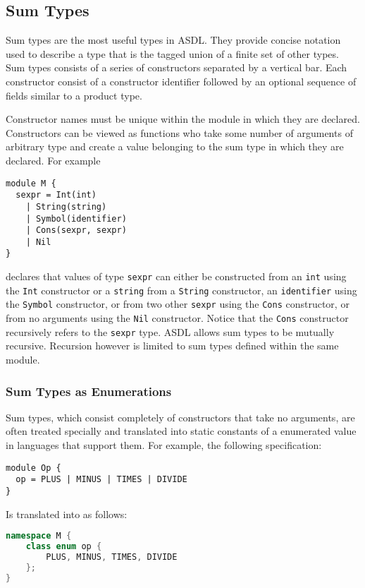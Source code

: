 \subsection{Sum Types}

Sum types are the most useful types in ASDL. They provide concise notation
used to describe a type that is the tagged union of a finite set of other
types.  Sum types consists of a series of constructors separated by a
vertical bar. Each constructor consist of a constructor identifier followed
by an optional sequence of fields similar to a product type. 

Constructor names must be unique within the module in which they are
declared. Constructors can be viewed as functions who take some number of
arguments of arbitrary type and create a value belonging to the sum type in
which they are declared. For example
\begin{code}\begin{lstlisting}[language=ASDL]
module M {
  sexpr = Int(int)
	| String(string)
	| Symbol(identifier)
	| Cons(sexpr, sexpr)
	| Nil
}
\end{lstlisting}\end{code}%
declares that values of type \lstinline[language=ASDL]!sexpr! can either be constructed from an
\lstinline[language=ASDL]!int! using the \lstinline[language=ASDL]!Int! constructor or a \lstinline[language=ASDL]!string! from a \lstinline[language=ASDL]!String!
constructor, an \lstinline[language=ASDL]!identifier! using the \lstinline[language=ASDL]!Symbol! constructor, or from
two other \lstinline[language=ASDL]!sexpr! using the \lstinline[language=ASDL]!Cons! constructor, or from no arguments
using the \lstinline[language=ASDL]!Nil! constructor. Notice that the \lstinline[language=ASDL]!Cons! constructor
recursively refers to the \lstinline[language=ASDL]!sexpr! type. ASDL allows sum types to be
mutually recursive. Recursion however is limited to sum types defined within
the same module.

\subsubsection{Sum Types as Enumerations}
\label{sec:enumerations}

Sum types, which consist completely of constructors that take no arguments,
are often treated specially and translated into static constants of a
enumerated value in languages that support them.
For example, the following \asdl{} specification:
%
\begin{code}\begin{lstlisting}[language=ASDL]
module Op {
  op = PLUS | MINUS | TIMES | DIVIDE 
}
\end{lstlisting}\end{code}%
%
Is translated into \Cplusplus{} as follows:
%
\begin{code}\begin{lstlisting}[language=c++]
namespace M {
    class enum op {
        PLUS, MINUS, TIMES, DIVIDE
    };
}
\end{lstlisting}\end{code}%

